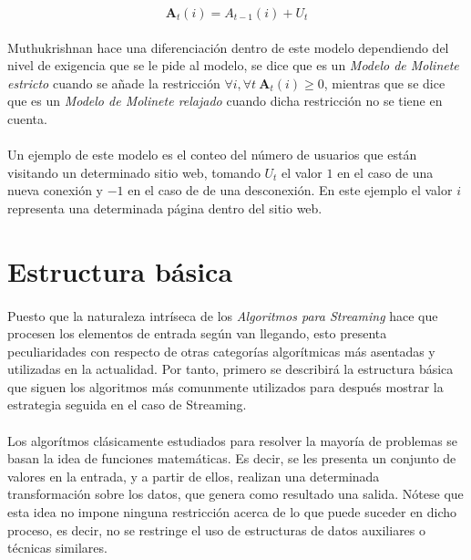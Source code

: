 \documentclass{subfiles}
\begin{document}
        \begin{equation}
        \label{eq:streaming_turnstile}
          \boldsymbol{A}_{t}(i) = {A}_{t-1}(i) + U_{t}
        \end{equation}

        \paragraph{}
        Muthukrishnan \cite{Muthukrishnan:2005:DSA:1166409.1166410} hace una diferenciación dentro de este modelo dependiendo del nivel de exigencia que se le pide al modelo, se dice que es un \emph{Modelo de Molinete estricto} cuando se añade la restricción $\forall i, \forall t \ \boldsymbol{A}_{t}(i) \geq 0$, mientras que se dice que es un \emph{Modelo de Molinete relajado} cuando dicha restricción no se tiene en cuenta.

        \paragraph{}
        Un ejemplo de este modelo es el conteo del número de usuarios que están visitando un determinado sitio web, tomando $U_t$ el valor $1$ en el caso de una nueva conexión y $-1$ en el caso de de una desconexión. En este ejemplo el valor $i$ representa una determinada página dentro del sitio web.

    \section{Estructura básica}
    \label{sec:streaming_structure}

      \paragraph{}
      Puesto que la naturaleza intríseca de los \emph{Algoritmos para Streaming} hace que procesen los elementos de entrada según van llegando, esto presenta peculiaridades con respecto de otras categorías algorítmicas más asentadas y utilizadas en la actualidad. Por tanto, primero se describirá la estructura básica que siguen los algoritmos más comunmente utilizados para después mostrar la estrategia seguida en el caso de Streaming.

      \paragraph{}
      Los algorítmos clásicamente estudiados para resolver la mayoría de problemas se basan la idea de funciones matemáticas. Es decir, se les presenta un conjunto de valores en la entrada, y a partir de ellos, realizan una determinada transformación sobre los datos, que genera como resultado una salida. Nótese que esta idea no impone ninguna restricción acerca de lo que puede suceder en dicho proceso, es decir, no se restringe el uso de estructuras de datos auxiliares o técnicas similares.
\end{document}
